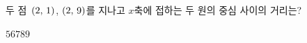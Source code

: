 두 점~$(2,\mkern3mu 1)$, $(2,\mkern3mu 9)$를 지나고 $x$축에 접하는 두 원의 중심 사이의 거리는?
\begin{choices32}{$5$}{$6$}{$7$}{$8$}{$9$}\end{choices32}
